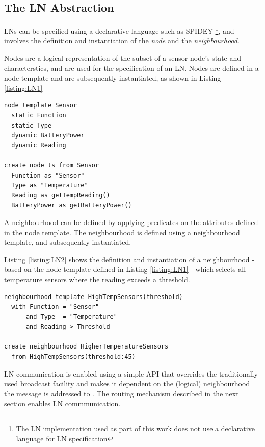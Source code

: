 \subsection{The LN Abstraction}

LNs can be specified using a declarative language such as SPIDEY
\cite{mottola_LN:2006, mottola_LNScoping:2006}\footnote{The LN implementation
used as part of this work does not use a declarative language for LN specification}, and
involves the definition and instantiation of the \emph{node} and the
\emph{neighbourhood}. 

Nodes are a logical representation of the subset of a sensor node's state and
characterstics, and are used for the specification of an LN. Nodes are defined
in a node template and are subsequently instantiated, as shown in Listing \ref{listing:LN1}
   
\begin{lstlisting}[frame=trbl, basewidth={0.55em, 0.6em}, captionpos=b, 
basicstyle=\ttfamily\footnotesize, breaklines, caption = Node Definition and Instantiation, label = listing:LN1]  
node template Sensor
  static Function
  static Type
  dynamic BatteryPower
  dynamic Reading

create node ts from Sensor
  Function as "Sensor"
  Type as "Temperature"
  Reading as getTempReading()
  BatteryPower as getBatteryPower()
\end{lstlisting}

A neighbourhood can be defined by applying predicates on the attributes defined
in the
node template. The neighbourhood is defined using a neighbourhood
template, and subsequently instantiated. 

Listing \ref{listing:LN2} shows the definition and
instantiation of a
neighbourhood - based on the node template defined in Listing \ref{listing:LN1}
- which selects all temperature sensors where the reading exceeds a threshold.
 
\begin{lstlisting}[frame=trbl, basewidth={0.55em, 0.6em}, captionpos=b, 
basicstyle=\ttfamily\footnotesize, breaklines, caption = Neighbourhood Definition and Instantiation, label = listing:LN2]  
neighbourhood template HighTempSensors(threshold)
  with Function = "Sensor" 
      and Type  = "Temperature" 
      and Reading > Threshold

create neighbourhood HigherTemperatureSensors
  from HighTempSensors(threshold:45)
\end{lstlisting}

LN communication is enabled using a simple API that overrides the
traditionally used broadcast facility and makes it dependent on the (logical)
neighbourhood the message is addressed to \cite{mottola_LN:2006}. The routing mechanism described in
the next section enables LN commmunication.


